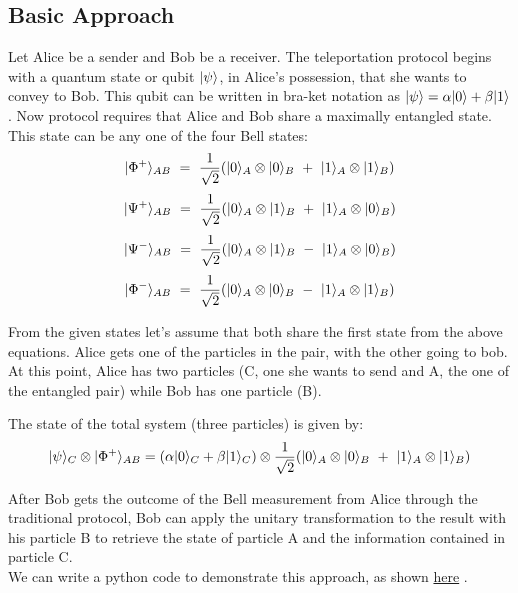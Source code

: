 \documentclass{article}
\DeclarePairedDelimiter\ket{\lvert}{\rangle}
\begin{document}
\subsection{Basic Approach}
Let Alice be a sender and Bob be a receiver. The teleportation protocol begins with a quantum state or qubit $\ket{\psi}$, in Alice's possession, that she wants to convey to Bob. This qubit can be written in bra-ket notation as $\ket{\psi} = \alpha \ket{0} + \beta \ket{1}$. Now protocol requires that Alice and Bob share a maximally entangled state. This state can be any one of the four Bell states:\cite{qtwiki}
\begin{equation}
    \ket{\Phi^{+}}_{AB}\ =\ \frac{1}{\sqrt{2}}(\ket{0}_{A} \otimes \ket{0}_{B}\ +\ \ket{1}_{A}\otimes \ket{1}_{B})
\end{equation}
\begin{equation}
    \ket{\Psi^{+}}_{AB}\ =\ \frac{1}{\sqrt{2}}(\ket{0}_{A} \otimes \ket{1}_{B}\ +\ \ket{1}_{A}\otimes \ket{0}_{B})
\end{equation}
\begin{equation}
    \ket{\Psi^{-}}_{AB}\ =\ \frac{1}{\sqrt{2}}(\ket{0}_{A} \otimes \ket{1}_{B}\ -\ \ket{1}_{A}\otimes \ket{0}_{B})
\end{equation}
\begin{equation}
    \ket{\Phi^{-}}_{AB}\ =\ \frac{1}{\sqrt{2}}(\ket{0}_{A} \otimes \ket{0}_{B}\ -\ \ket{1}_{A}\otimes \ket{1}_{B})
\end{equation}


From the given states let's assume that both share the first state from the above equations. Alice gets one of the particles in the pair, with the other going to bob. At this point, Alice has two particles (C, one she wants to send and A, the one of the entangled pair) while Bob has one particle (B). 

The state of the total system (three particles) is given by:\cite{qtwiki}
\begin{equation}
    \ket{\psi}_{C} \otimes \ket{\Phi^{+}}_{AB} = (\alpha \ket{0}_{C} + \beta \ket{1}_{C}) \otimes \frac{1}{\sqrt{2}}(\ket{0}_{A} \otimes \ket{0}_{B}\ +\ \ket{1}_{A}\otimes \ket{1}_{B})
\end{equation}

After Bob gets the outcome of the Bell measurement from Alice through the traditional protocol, Bob can apply the unitary transformation to the result with his particle B to retrieve the state of particle A and the information contained in particle C.\\
We can write a python code to demonstrate this approach, as shown \textcolor{blue}{ \href{https://qiskit.org/textbook/ch-algorithms/teleportation.html#2.-The-Quantum-Teleportation-Protocol-}{here}} \cite{telecode}.
\end{document}
